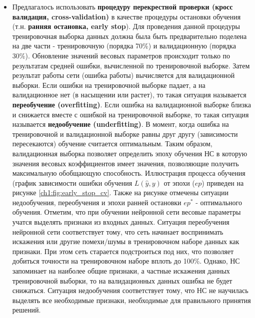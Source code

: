 \documentclass[12pt]{article}
\begin{document}
\begin{sloppypar}
\begin{itemize}
    \item Предлагалось использовать \textbf{процедуру перекрестной проверки (кросс валидация, cross-validation)} в качестве процедуры остановки обучения (т.н. \textbf{ранняя остановка, early stop}). Для проведения данной процедуры тренировочная выборка данных должна была быть предварительно поделена на две части - тренировочную (порядка 70\%) и валидационную (порядка 30\%). Обновление значений весовых параметров происходит только по результатам средней ошибки, вычисленной по тренировочной выборке. Затем результат работы сети (ошибка работы) вычисляется для валидационной выборки. Если ошибки на тренировочной выборке падает, а на валидационное нет (в насыщении или растет), то такая ситуация называется \textbf{переобучение (overfitting)}. Если ошибка на валидационной выборке близка и снижается вместе с ошибкой на тренировочной выборке, то такая ситуация называется \textbf{недообучение (underfitting)}.  В момент, когда ошибка на тренировочной и валидационной выборке равны друг другу (зависимости пересекаются) обучение считается оптимальным. Таким образом, валидационная выборка позволяет определить эпоху обучения НС в которую значения весовых коэффициентов имеет значения, позволяющие получить максимальную обобщающую способность. Иллюстрация процесса обучения (график зависимости ошибки обучения $L(\hat y,y)$ от эпохи ($ep$) приведен на рисунке \ref{ch1:fig:early_stop_cv}. Также на рисунке отмечены ситуации недообучения, переобучения и эпохи ранней остановки $ep^*$ - оптимального обучения. Отметим, что при обучении нейронной сети весовые параметры учатся выделять признаки из входных данных. Ситуация переобучения нейронной сети соответствует тому, что сеть начинает воспринимать искажения или другие помехи/шумы в тренировочном наборе данных как признаки. При этом сеть старается подстроиться под них, что позволяет добиться точности на тренировочном наборе вплоть до 100\%. Однако, НС запоминает на наиболее общие признаки, а частные искажения данных тренировочной выборки, то на валидационных данных ошибка не будет снижаться. Ситуация недообучения соответствует тому, что НС не научилась выделять все необходимые признаки, необходимые для правильного принятия решений.
    

\end{itemize}
\end{sloppypar}
\end{document}
